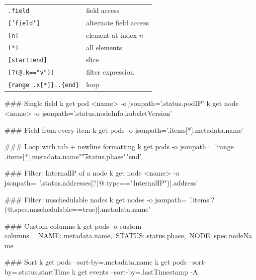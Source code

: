 \begin{cheatcodetex}
  \ttfamily\fontsize{6.5}{7.5}\selectfont
  \begin{tabular}{@{}ll@{}}
    \texttt{.field}              & field access \\
    \texttt{['field']}           & alternate field access \\
    \texttt{[n]}                 & element at index $n$ \\
    \texttt{[*]}                 & all elements \\
    \texttt{[start:end]}         & slice \\
    \texttt{[?(@.k=="v")]}       & filter expression \\
    \texttt{\{range .x[*]\}..\{end\}} & loop \\
  \end{tabular}
\end{cheatcodetex}

\begin{cheatcodebash}
### Single field
k get pod <name>  -o jsonpath='{.status.podIP}'
k get node <name> -o jsonpath='{.status.nodeInfo.kubeletVersion}'
\end{cheatcodebash}

\begin{cheatcodebash}
### Field from every item
k get pods -o jsonpath='{.items[*].metadata.name}'
\end{cheatcodebash}

\begin{cheatcodebash}
### Loop with tab + newline formatting
k get pods -o jsonpath=\
  '{range .items[*]}{.metadata.name}{"\t"}{.status.phase}{"\n"}{end}'
\end{cheatcodebash}

\begin{cheatcodebash}
### Filter: InternalIP of a node
k get node <name> -o jsonpath=\
  '{.status.addresses[?(@.type=="InternalIP")].address}'
\end{cheatcodebash}

\begin{cheatcodebash}
### Filter: unschedulable nodes
k get nodes -o jsonpath=\
  '{.items[?(@.spec.unschedulable==true)].metadata.name}'
\end{cheatcodebash}

\tcbsubtitle{Custom Columns \& Sort}
\begin{cheatcodebash}
### Custom columns
k get pods -o custom-columns=\
  NAME:.metadata.name,\
  STATUS:.status.phase,\
  NODE:.spec.nodeName
\end{cheatcodebash}

\begin{cheatcodebash}
### Sort
k get pods   --sort-by=.metadata.name
k get pods   --sort-by=.status.startTime
k get events --sort-by=.lastTimestamp -A
\end{cheatcodebash}
